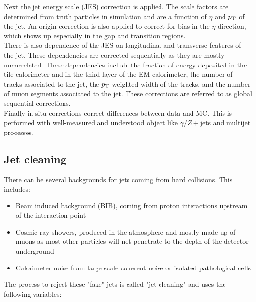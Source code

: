 Next the jet energy scale (JES) correction is applied.  The scale factors are determined from truth particles in simulation and are a function of $\eta$ and $p_{\mathrm{T}}$ of the jet.  An origin correction is also applied to correct for bias in the $\eta$ direction, which shows up especially in the gap and transition regions. \\

There is also dependence of the JES on longitudinal and transverse features of the jet.  These dependencies are corrected sequentially as they are mostly uncorrelated.  These dependencies include the fraction of energy deposited in the tile calorimeter and in the third layer of the EM calorimeter, the number of tracks associated to the jet, the $p_{\mathrm{T}}$-weighted width of the tracks, and the number of muon segments associated to the jet.  These corrections are referred to as global sequential corrections. \\

Finally in situ corrections correct differences between data and MC.  This is performed with well-measured and understood object like $\gamma / Z+$jets and multijet processes. \\

\subsection{Jet cleaning}
\label{section:jetcleaning}

There can be several backgrounds for jets coming from hard collisions.  This includes\cite{jetCleaning}:

\begin{itemize}
	\item Beam induced background (BIB), coming from proton interactions upstream of the interaction point
	\item Cosmic-ray showers, produced in the atmosphere and mostly made up of muons as most other particles will not penetrate to the depth of the detector underground
	\item Calorimeter noise from large scale coherent noise or isolated pathological cells
\end{itemize}

The process to reject these "fake" jets is called "jet cleaning" and uses the following variables:


